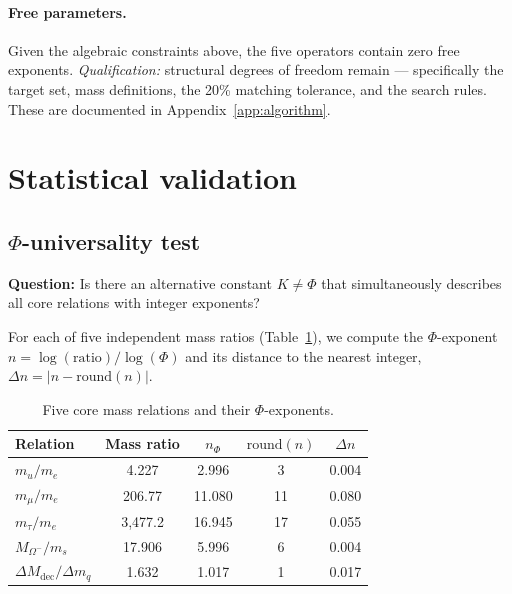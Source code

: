 \documentclass[11pt,a4paper]{article}
\begin{document}
\paragraph{Free parameters.}
Given the algebraic constraints above, the five operators contain zero
free exponents. \emph{Qualification:} structural degrees of freedom
remain --- specifically the target set, mass definitions, the 20\%
matching tolerance, and the search rules. These are documented in
Appendix~\ref{app:algorithm}.

\section{Statistical validation}
\label{sec:stats}

\subsection{\texorpdfstring{$\Phi$}{Phi}-universality test}
\label{sec:universality}

\textbf{Question:} Is there an alternative constant $K \neq \Phi$
that simultaneously describes all core relations with integer
exponents?

For each of five independent mass ratios (Table~\ref{tab:universality}),
we compute the $\Phi$-exponent
$n = \log(\text{ratio})/\log(\Phi)$ and its distance to the nearest
integer, $\Delta n = |n - \text{round}(n)|$.

\begin{table}[H]
\centering
\caption{Five core mass relations and their $\Phi$-exponents.}
\label{tab:universality}
\begin{tabular}{@{}lcccc@{}}
\toprule
Relation & Mass ratio & $n_\Phi$ & $\text{round}(n)$ & $\Delta n$ \\
\midrule
$m_u / m_e$                        & 4.227  & 2.996  & 3  & 0.004 \\
$m_\mu / m_e$                      & 206.77 & 11.080 & 11 & 0.080 \\
$m_\tau / m_e$                     & 3{,}477.2 & 16.945 & 17 & 0.055 \\
$M_{\Omega^-} / m_s$               & 17.906 & 5.996  & 6  & 0.004 \\
$\Delta M_\text{dec} / \Delta m_q$ & 1.632  & 1.017  & 1  & 0.017 \\
\bottomrule
\end{tabular}
\end{table}
\end{document}
